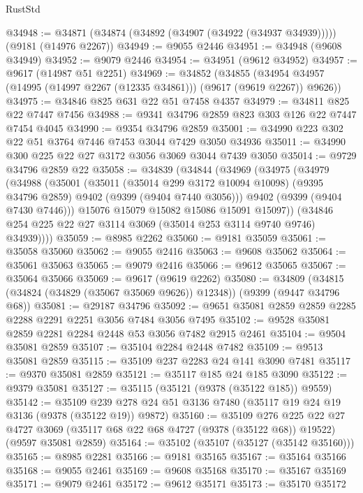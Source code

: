 \begin{lexlean}{RustStd}
\begin{coremodule}
@34948 := @34871 (@34874 (@34892 (@34907 (@34922 (@34937 @34939))))) (@9181 (@14976 @2267))
@34949 := @9055 @2446
@34951 := @34948 (@9608 @34949)
@34952 := @9079 @2446
@34954 := @34951 (@9612 @34952)
@34957 := @9617 (@14987 @51 @2251)
@34969 := @34852
    (@34855 (@34954 @34957 (@14995 (@14997 @2267 (@12335 @34861))) (@9617 (@9619 @2267)) @9626))
@34975 := @34846 @825 @631 @22 @51 @7458 @4357
@34979 := @34811 @825 @22 @7447 @7456
@34988 := @9341 @34796 @2859 @823 @303 @126 @22 @7447 @7454 @4045
@34990 := @9354 @34796 @2859
@35001 := @34990 @223 @302 @22 @51 @3764 @7446 @7453 @3044 @7429 @3050 @34936
@35011 := @34990 @300 @225 @22 @27 @3172 @3056 @3069 @3044 @7439 @3050
@35014 := @9729 @34796 @2859 @22
@35058 := @34839
    (@34844
      (@34969
        (@34975
          (@34979
            (@34988
              (@35001
                (@35011
                  (@35014 @299 @3172 @10094 @10098)
                  (@9395 @34796 @2859)
                  @9402
                  (@9399 (@9404 @7440 @3056)))
                @9402
                (@9399 (@9404 @7430 @7446)))
              @15076
              @15079
              @15082
              @15086
              @15091
              @15097))
          (@34846 @254 @225 @22 @27 @3114 @3069 (@35014 @253 @3114 @9740 @9746) @34939))))
@35059 := @8985 @2262
@35060 := @9181 @35059
@35061 := @35058 @35060
@35062 := @9055 @2416
@35063 := @9608 @35062
@35064 := @35061 @35063
@35065 := @9079 @2416
@35066 := @9612 @35065
@35067 := @35064 @35066
@35069 := @9617 (@9619 @2262)
@35080 := @34809 (@34815 (@34824 (@34829 (@35067 @35069 @9626)) @12348)) (@9399 (@9447 @34796 @68))
@35081 := @29187 @34796
@35092 := @9651 @35081 @2859 @2859 @2285 @2288 @2291 @2251 @3056 @7484 @3056 @7495
@35102 := @9528 @35081 @2859 @2281 @2284 @2448 @53 @3056 @7482 @2915 @2461
@35104 := @9504 @35081 @2859
@35107 := @35104 @2284 @2448 @7482
@35109 := @9513 @35081 @2859
@35115 := @35109 @237 @2283 @24 @141 @3090 @7481
@35117 := @9370 @35081 @2859
@35121 := @35117 @185 @24 @185 @3090
@35122 := @9379 @35081
@35127 := @35115 (@35121 (@9378 (@35122 @185)) @9559)
@35142 := @35109 @239 @278 @24 @51 @3136 @7480 (@35117 @19 @24 @19 @3136 (@9378 (@35122 @19)) @9872)
@35160 := @35109
    @276
    @225
    @22
    @27
    @4727
    @3069
    (@35117 @68 @22 @68 @4727 (@9378 (@35122 @68)) @19522)
    (@9597 @35081 @2859)
@35164 := @35102 (@35107 (@35127 (@35142 @35160)))
@35165 := @8985 @2281
@35166 := @9181 @35165
@35167 := @35164 @35166
@35168 := @9055 @2461
@35169 := @9608 @35168
@35170 := @35167 @35169
@35171 := @9079 @2461
@35172 := @9612 @35171
@35173 := @35170 @35172

\end{coremodule}
\end{lexlean}
